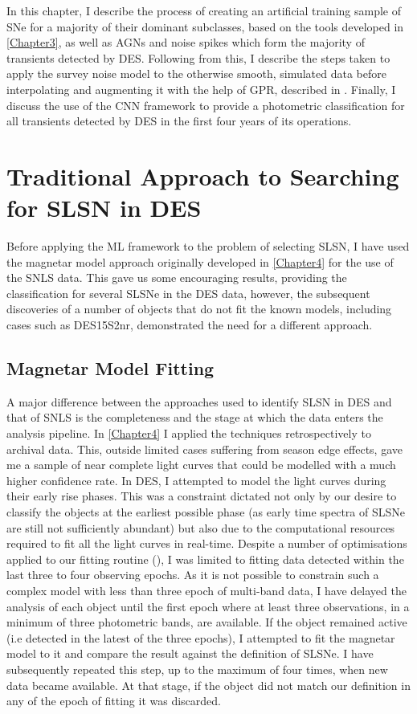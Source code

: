 In this chapter, I describe the process of creating an artificial training sample of SNe for a majority of their dominant subclasses, based on the tools developed in \cref{Chapter3}, as well as AGNs and noise spikes which form the majority of transients detected by DES. Following from this, I describe the steps taken to apply the survey noise model to the otherwise smooth, simulated data before interpolating and augmenting it with the help of GPR, described in . Finally, I discuss the use of the CNN framework to provide a photometric classification for all transients detected by DES in the first four years of its operations.

\section{Traditional Approach to Searching for SLSN in DES}
Before applying the ML framework to the problem of selecting SLSN, I have used the magnetar model approach originally developed in \cref{Chapter4} for the use of the SNLS data. This gave us some encouraging results, providing the classification for several SLSNe in the DES data, however, the subsequent discoveries of a number of objects that do not fit the known models, including cases such as DES15S2nr, demonstrated the need for a different approach.

\subsection{Magnetar Model Fitting}
A major difference between the approaches used to identify SLSN in DES and that of SNLS is the completeness and the stage at which the data enters the analysis pipeline. In \cref{Chapter4} I applied the techniques retrospectively to archival data. This, outside limited cases suffering from season edge effects, gave me a sample of near complete light curves that could be modelled with a much higher confidence rate. In DES, I attempted to model the light curves during their early rise phases. This was a constraint dictated not only by our desire to classify the objects at the earliest possible phase (as early time spectra of SLSNe are still not sufficiently abundant) but also due to the computational resources required to fit all the light curves in real-time. Despite a number of optimisations applied to our fitting routine (), I was limited to fitting data detected within the last three to four observing epochs. As it is not possible to constrain such a complex model with less than three epoch of multi-band data, I have delayed the analysis of each object until the first epoch where at least three observations, in a minimum of three photometric bands, are available. If the object remained active (i.e detected in the latest of the three epochs), I attempted to fit the magnetar model to it and compare the result against the definition of SLSNe. I have subsequently repeated this step, up to the maximum of four times, when new data became available. At that stage, if the object did not match our definition in any of the epoch of fitting it was discarded.

